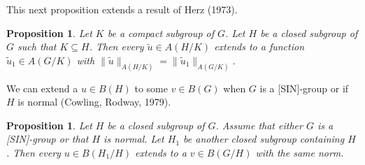 \documentclass[landscape]{slides}
\newtheorem{prop}[defn]{Proposition}
\begin{document}
\begin{slide}
This next proposition extends a result of Herz (1973).

\begin{prop}
Let $K$ be a compact subgroup of $G$.  Let $H$ be a closed subgroup of $G$ such that $K\subseteq H$.
Then every $\tilde{u} \in A(H/K)$ extends to a function $\tilde{u}_1 \in A(G/K)$ with
$\|\tilde{u}\|_{A(H/K)} = \|\tilde{u}_1\|_{A(G/K)}$.
\end{prop}

We can extend a $u \in B(H)$ to some $v\in B(G)$ when $G$ is a [SIN]-group
or if $H$ is normal (Cowling, Rodway, 1979).

\begin{prop}
Let $H$ be a closed subgroup of $G$.  Assume that either $G$ is a [SIN]-group or that $H$ is normal.
Let $H_1$ be another closed subgroup containing $H$.  Then every $u\in B(H_1/H)$ extends to a 
$v\in B(G/H)$ with the same norm.
\end{prop}
\end{slide}
\end{document}
